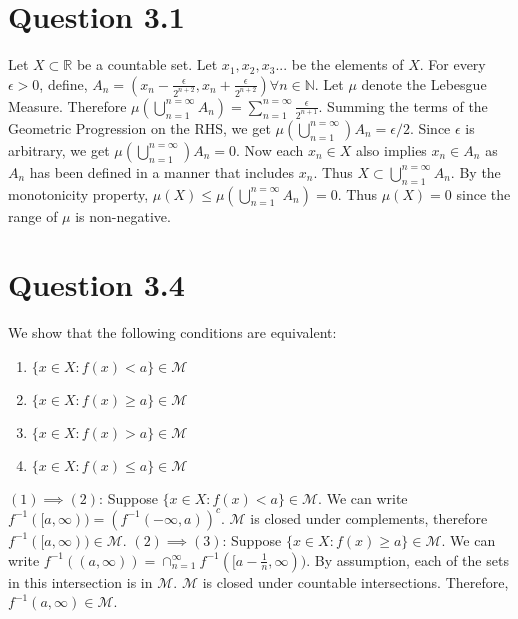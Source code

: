 \documentclass{article}
\begin{document}
  \section*{Question 3.1}
    Let $X \subset \mathbb R$ be a countable set. Let $x_1, x_2, x_3 ...$ be the elements of $X$. For every $\epsilon > 0$, define, $A_n = (x_n - \frac{\epsilon}{2^{n+2}}, x_n + \frac{\epsilon}{2^{n+2}}) \forall n \in \mathbb N$.
    \newline
    \newline
    Let $\mu$ denote the Lebesgue Measure. Therefore $\mu(\bigcup_{n=1}^{n=\infty}A_n) = \sum_{n=1}^{n=\infty}\frac{\epsilon}{2^{n+1}}$. Summing the terms of the Geometric Progression on the RHS, we get
    $\mu(\bigcup_{n=1}^{n=\infty})A_n = \epsilon /2$. Since $\epsilon$ is arbitrary, we get $\mu(\bigcup_{n=1}^{n=\infty})A_n = 0$. Now each $x_n \in X$ also implies $x_n \in A_n$ as $A_n$ has been defined in a manner that includes $x_n$.
    \newline
    \newline
    Thus $X \subset \bigcup_{n=1}^{n=\infty}A_n$. By the monotonicity property, $\mu(X) \le \mu(\bigcup_{n=1}^{n=\infty}A_n) = 0$. Thus $\mu(X) = 0$ since the range of $\mu$ is non-negative.

  \section*{Question 3.4}
  We show that the following conditions are equivalent:
    \begin{enumerate}
      \item $\{x \in X : f(x) < a \} \in \mathcal{M}$
      \item $\{x \in X : f(x) \geq a \} \in \mathcal{M}$
      \item $\{x \in X : f(x) > a \} \in \mathcal{M}$
      \item $\{x \in X : f(x) \leq a \} \in \mathcal{M}$
    \end{enumerate}


      $(1) \implies (2)$: 
      \newline
      Suppose $\{x \in X : f(x) < a \} \in \mathcal{M}$. We can write $f^{-1}([a, \infty)) = (f^{-1}(-\infty, a))^c$. $\mathcal{M}$
      is closed under complements, therefore $f^{-1}([a, \infty)) \in \mathcal{M}$.
\newline
    \newline
      $(2) \implies (3)$: 
      \newline
      Suppose $\{x \in X : f(x) \geq a \} \in \mathcal{M}$. We can write $f^{-1}((a, \infty)) = \cap_{n=1}^{\infty} f^{-1}([a - \frac{1}{n}, \infty))$.
      By assumption, each of the sets in this intersection is in $\mathcal{M}$. $\mathcal{M}$
      is closed under countable intersections. Therefore, $f^{-1}(a, \infty) \in \mathcal{M}$.
      \newline
    \newline
\end{document}
